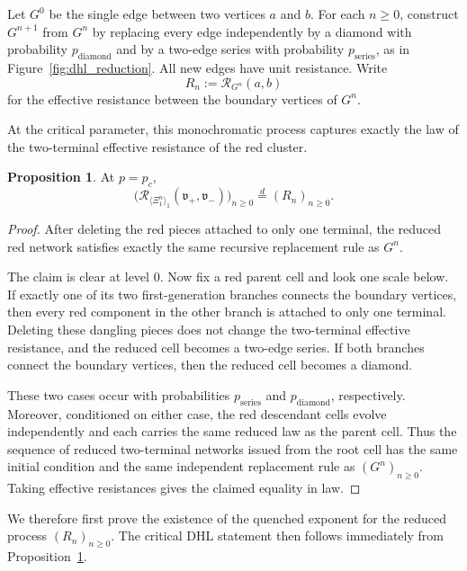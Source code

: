 \documentclass{article}
\theoremstyle{plain}
\theoremstyle{definition}
\newtheorem{proposition}[theorem]{Proposition}
\newcommand{\Reff}{\mathscr{R}}
\begin{document}
Let $G^0$ be the single edge between two vertices $a$ and $b$.
For each $n\ge 0$, construct $G^{n+1}$ from $G^n$ by replacing every edge independently by a diamond with probability $p_{\mathrm{diamond}}$ and by a two-edge series with probability $p_{\mathrm{series}}$, as in Figure~\ref{fig:dhl_reduction}.
All new edges have unit resistance.
Write
\[
R_n:=\Reff_{G^n}(a,b)
\]
for the effective resistance between the boundary vertices of $G^n$.

At the critical parameter, this monochromatic process captures exactly the law of the two-terminal effective resistance of the red cluster.

\begin{proposition}\label{prop:dhl_reduction}
At $p=p_c$,
\[
\bigl(\Reff_{\langle \Xi_1^n\rangle_1}(\mathfrak v_+,\mathfrak v_-)\bigr)_{n\ge 0}
\stackrel{d}{=}
(R_n)_{n\ge 0}.
\]
\end{proposition}

\begin{proof}
 
After deleting the red pieces attached to only one terminal, the reduced red network satisfies exactly the same recursive replacement rule as $G^n$.

The claim is clear at level $0$.
Now fix a red parent cell and look one scale below.
If exactly one of its two first-generation branches connects the boundary vertices, then every red component in the other branch is attached to only one terminal.
Deleting these dangling pieces does not change the two-terminal effective resistance, and the reduced cell becomes a two-edge series.
If both branches connect the boundary vertices, then the reduced cell becomes a diamond.

These two cases occur with probabilities $p_{\mathrm{series}}$ and $p_{\mathrm{diamond}}$, respectively.
Moreover, conditioned on either case, the red descendant cells evolve independently and each carries the same reduced law as the parent cell.
Thus the sequence of reduced two-terminal networks issued from the root cell has the same initial condition and the same independent replacement rule as $(G^n)_{n\ge 0}$.
Taking effective resistances gives the claimed equality in law.
\end{proof}

We therefore first prove the existence of the quenched exponent for the reduced process $(R_n)_{n\ge 0}$.
The critical DHL statement then follows immediately from Proposition~\ref{prop:dhl_reduction}.
\end{document}
